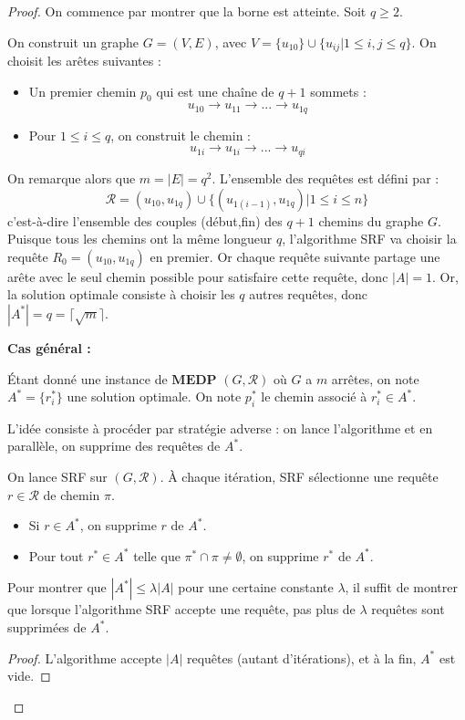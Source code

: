 \begin{proof}
On commence par montrer que la borne est atteinte. Soit $q\geq 2$. 

On construit un graphe $G=(V,E)$, avec $V= \{u_{10}\} \cup \{u_{ij} | 1\leq i,j\leq q\}$. On choisit les arêtes suivantes :
\begin{itemize}
\item Un premier chemin $p_0$ qui est une chaîne de $q+1$ sommets :
$$
u_{10} \rightarrow u_{11} \rightarrow ... \rightarrow u_{1q}
$$
\item Pour $1 \leq i \leq q$, on construit le chemin : 
$$
u_{1i} \rightarrow u_{1i} \rightarrow ... \rightarrow u_{qi}
$$
\end{itemize}

On remarque alors que $m=|E|=q^2$. L'ensemble des requêtes est défini par :
$$
\mathcal{R} = (u_{10},u_{1q}) \cup \{(u_{1(i-1)},u_{1q}) | 1\leq i \leq n\}
$$
c'est-à-dire l'ensemble des couples (début,fin) des $q+1$ chemins du graphe $G$.
Puisque tous les chemins ont la même longueur $q$, l'algorithme SRF va choisir la requête $R_0=(u_{10},u_{1q}) $ en premier. Or chaque requête suivante partage une arête avec le seul chemin possible pour satisfaire cette requête, donc $|A|=1$. Or, la solution optimale consiste à choisir les $q$ autres requêtes, donc $|A^*|=q=\lceil\sqrt{m}\rceil$.\newline


\textbf{Cas général :}

Étant donné une instance de $\mathbf{MEDP}$ $(G,\mathcal{R})$ où $G$ a $m$ arrêtes, on note $A^* = \{r_i^*\}$ une solution optimale. On note $p_i^*$ le chemin associé à $r_i^*\in A^*$.

L'idée consiste à procéder par stratégie adverse : on lance l'algorithme et en parallèle, on supprime des requêtes de $A^*$.


On lance SRF sur $(G,\mathcal{R})$. À chaque itération, SRF sélectionne une requête $r\in \mathcal{R}$ de chemin $\pi$.
\begin{itemize}
\item Si $r\in A^*$, on supprime $r$ de $A^*$.
\item Pour tout $r^*\in A^*$ telle que $\pi^* \cap \pi \neq \emptyset$, on supprime $r^*$ de $A^*$.
\end{itemize}

\begin{lemma}\label{lemmeApproxRoutage}
Pour montrer que $|A^*| \leq \lambda |A|$ pour une certaine constante $\lambda$, il suffit de montrer que lorsque l'algorithme SRF accepte une requête, pas plus de $\lambda$ requêtes sont supprimées de $A^*$.
\end{lemma}
\begin{proof}
L'algorithme accepte $|A|$ requêtes (autant d'itérations), et à la fin, $A^*$ est vide.
\end{proof}


\end{proof}
